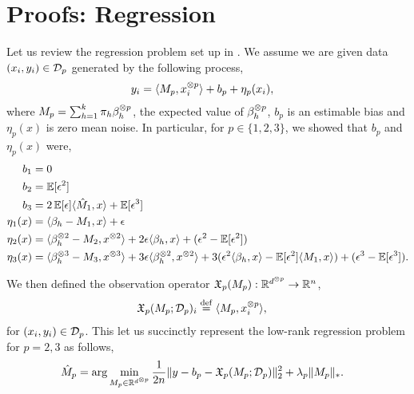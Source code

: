 \section{Proofs: Regression}
\label{sec:proofs:regression}
\setcounter{lemma}{0}


Let us review the regression problem set up in 
\iftoggle{withappendix}{\refsec{algo}}{\cite[Section 3]{ChagantyLiang2013}}. 
We assume we are given data $(x_i,y_i) \in \mathcal{D}_p$
generated by the following process,
\begin{align*}
  y_i &= \langle M_p, x_i^{\otimes p} \rangle + b_p + \eta_p(x_i),
\end{align*}
where $M_p = \sum_{h=1}^k \pi_h \beta_h^{\otimes p}$, the expected value of $\beta_h^{\otimes p}$, $b_p$ is an estimable bias and $\eta_p(x)$ is zero mean noise. In particular, for $p \in \{1,2,3\}$,
we showed that $b_p$ and $\eta_p(x)$ were,
\begin{align}
  b_1 &= 0 \nonumber \\
  b_2 &= \operatorname{\mathbb{E}}[\epsilon^2] \nonumber \\
  b_3 &= 2\operatorname{\mathbb{E}}[\epsilon]\langle \hat M_1, x \rangle + \operatorname{\mathbb{E}}[\epsilon^3] \nonumber \\
  \eta_1(x) &= \langle \beta_h - M_1, x \rangle + \epsilon \label{eqn:app:eta1} \\
  \eta_2(x) &= \langle \beta_h^{\otimes 2} - M_2, x^{\otimes 2} \rangle + 2 \epsilon \langle \beta_h, x \rangle + (\epsilon^2 - \operatorname{\mathbb{E}}[\epsilon^2]) \label{eqn:app:eta2}\\
  \eta_3(x) &= \langle \beta_h^{\otimes 3} - M_3, x^{\otimes 3} \rangle
        + 3 \epsilon \langle \beta_h^{\otimes 2}, x^{\otimes 2} \rangle 
        + 3(\epsilon^2 \langle \beta_h, x \rangle - \operatorname{\mathbb{E}}[\epsilon^2] \langle M_1, x \rangle)
        + (\epsilon^3 - \operatorname{\mathbb{E}}[\epsilon^3]). \label{eqn:app:eta3}
\end{align}

We then defined the observation operator $\operatorname{\mathfrak{X}}_p(M_p) : \mathbb{R}^{d^{\otimes p}} \to \mathbb{R}^{n}$,
\begin{align*}
\operatorname{\mathfrak{X}}_p(M_p; \mathcal{D}_p)_i &\stackrel{\rm def}{=} \langle M_p, x^{\otimes p}_i \rangle,
\end{align*}
for $(x_i, y_i) \in \mathcal{D}_p$. This let us succinctly represent the
low-rank regression problem for $p = 2,3$ as follows,
\begin{align*}
  \hat M_p &=
  \arg\min_{M_p \in \mathbb{R}^{d^{\otimes p}}} \frac{1}{2n} \| y - b_p - \operatorname{\mathfrak{X}}_p(M_p; \mathcal{D}_p) \|^2_2 + \lambda_p \|M_p\|_*.
\end{align*}


